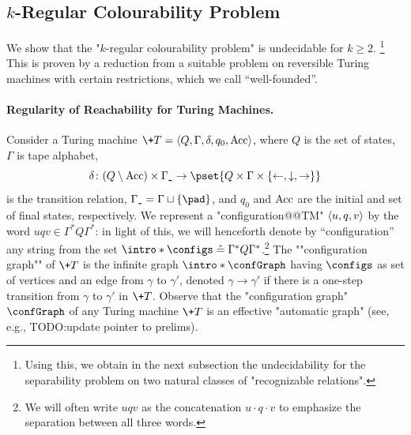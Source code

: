 \subsection{
    \AP\label{sec:dichotomy-k-regular-colourability}%
    $k$-Regular Colourability Problem
}

We show that the "$k$-regular colourability problem" is undecidable for $k\geq 2$.%
\footnote{
    Using this, we obtain in the next subsection 
    the undecidability for the separability problem on two natural classes of 
    "recognizable relations".
}
This is proven by a reduction from a suitable problem on reversible 
Turing machines with certain restrictions, which we call ``well-founded''.

\paragraph*{Regularity of Reachability for Turing Machines.}
Consider a Turing machine $\+T = \tup{Q,\Gamma,\delta,q_0,\Acc}$, where $Q$ is the set of states, $\Gamma$ is tape alphabet,
\[
    \delta\colon (Q \setminus \Acc) \times \Gamma_{\smallpad} \to \pset{Q \times \Gamma \times \set{\leftarrow, \downarrow, \rightarrow}}
\]
is the transition relation, $\Gamma_{\smallpad} = \Gamma \dcup \set{\pad}$, and $q_0$ and $\textrm{Acc}$ are the initial and set of final states, respectively.
%
We represent a "configuration@@TM" $\langle u, q, v\rangle$ by the word $uqv \in \Gamma^* Q \Gamma^*$:
in light of this, we will henceforth denote by ``configuration'' any string from the set  \AP$\intro*\configs \defeq  \Gamma^* Q \Gamma^*$.\footnote{We will often write
$uqv$ as the concatenation $u\cdot q \cdot v$ to emphasize
the separation between all three words.}
The \AP""configuration graph"" of $\+T$ is the infinite graph $\intro*\confGraph$ having $\configs$ as set of vertices and an edge from $\gamma$ to $\gamma'$, denoted $\gamma \rightarrow \gamma'$ if there is a one-step transition from $\gamma$ to $\gamma'$ in $\+T$. Observe that the "configuration graph" $\confGraph$ of any Turing machine $\+T$ is an effective "automatic graph" (see, e.g., \cite{KuskeLohrey2010AutomaticGraphs} TODO:update pointer to prelims).


